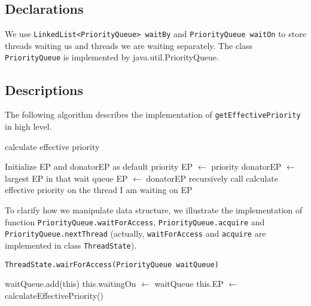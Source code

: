 \documentclass{article}
\begin{document}
\begin{spacing}{1.1}
\subsection{Declarations}

We use \texttt{LinkedList<PriorityQueue> waitBy} and \texttt{PriorityQueue waitOn} to store threads waiting us and threads we are waiting separately. The class \texttt{PriorityQueue} is implemented by java.util.PriorityQueue.

\subsection{Descriptions}

The following algorithm describes the implementation of \texttt{getEffectivePriority} in high level.

\begin{algorithm}[htbp]
  \caption{calculate effective priority}
\begin{algorithmic}[1]
  \State Initialize EP and donatorEP as default priority
  \State EP $\leftarrow$ priority
  \State donatorEP $\leftarrow$ largest EP in that wait queue
    \State EP $\leftarrow$ donatorEP
  \EndIf
\EndFor
\State recursively call calculate effective priority on the thread I am waiting on
\Return EP
\end{algorithmic}
\end{algorithm}

To clarify how we manipulate data structure, we illustrate the implementation of function \linebreak \texttt{PriorityQueue.waitForAccess}, \texttt{PriorityQueue.acquire} and \texttt{PriorityQueue.nextThread} (actually, \linebreak \texttt{waitForAccess} and \texttt{acquire} are implemented in class \texttt{ThreadState}).

\begin{algorithm}[htbp]
  \caption{\texttt{ThreadState.wairForAccess(PriorityQueue waitQueue)}}
\begin{algorithmic}[1]
  \State waitQueue.add(this)  
  \State this.waitingOn $\leftarrow$ waitQueue  
  \State this.EP $\leftarrow$ calculateEffectivePriority()  
\Return
\end{algorithmic}
\end{algorithm}


\end{spacing}
\end{document}
